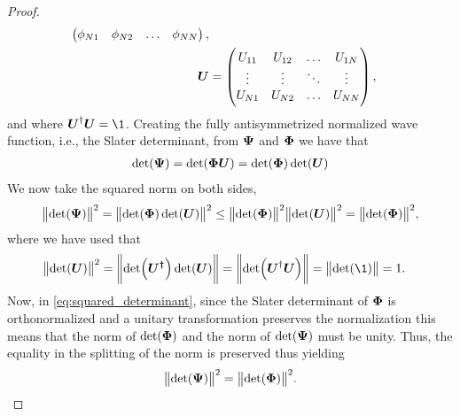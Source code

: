 \begin{proof}
\begin{align}
\begin{pmatrix}
                        \phi_{N1} & \phi_{N2} & \dots & \phi_{NN}
                    \end{pmatrix}, \\
                    \boldsymbol{U}
                    &= \begin{pmatrix}
                        U_{11} & U_{12} & \dots & U_{1N} \\
                        \vdots & \vdots & \ddots & \vdots \\
                        U_{N1} & U_{N2} & \dots & U_{NN}
                    \end{pmatrix},
                \end{align}
                and where $\vfg{U}^{\dagger}\vfg{U} = \1$.
                Creating the fully antisymmetrized normalized wave function, i.e.,
                the Slater determinant, from $\boldsymbol{\Psi}$ and $\boldsymbol{\Phi}$ we have
                that
                \begin{gather}
                    \det(\boldsymbol{\Psi}) = \det(\boldsymbol{\Phi}\boldsymbol{U})
                    = \det(\boldsymbol{\Phi})\det(\boldsymbol{U})
                \end{gather}
                We now take the squared norm on both sides,
                \begin{align}
                    \norm{\det(\boldsymbol{\Psi})}^2
                    = \norm{\det(\boldsymbol{\Phi})\det(\boldsymbol{U})}^2
                    \leq
                    \norm{\det(\boldsymbol{\Phi})}^2\norm{\det(\boldsymbol{U})}^2
                    = \norm{\det(\boldsymbol{\Phi})}^2,
                    \label{eq:squared_determinant}
                \end{align}
                where we have used that
                \begin{align}
                    \norm{\det(\vfg{U})}^2
                    &= \norm{\det(\vfg{U^{\dagger}})\det(\vfg{U})}
                    = \norm{\det(\vfg{U}^{\dagger}\vfg{U})}
                    = \norm{\det(\1)} = 1.
                \end{align}
                Now, in \autoref{eq:squared_determinant}, since the Slater
                determinant of $\boldsymbol{\Phi}$ is orthonormalized and a unitary
                transformation preserves the normalization this means that the norm
                of $\det(\boldsymbol{\Phi})$ and the norm of $\det(\boldsymbol{\Psi})$ must be
                unity.  Thus, the equality in the splitting of the norm is preserved
                thus yielding
                \begin{gather}
                    \norm{\det(\boldsymbol{\Psi})}^2 = \norm{\det(\boldsymbol{\Phi})}^2.
                \end{gather}
            \end{proof}

